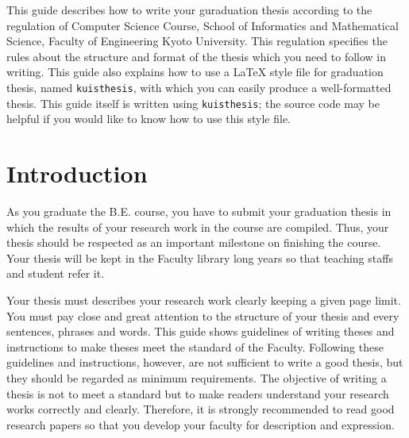 \documentclass[english]{kuisthesis}
\date{February 10, 2021}			%
\begin{document}
\maketitle					%

\begin{eabstract}				%
This guide describes how to write your guraduation thesis
according to the regulation of Computer Science Course, 
School of Informatics and Mathematical Science,
Faculty of Engineering Kyoto University. 
This regulation specifies the rules about the structure 
and format of the thesis which you need to follow in writing.
This guide also explains how to use a \LaTeX{} style file for
graduation thesis, named \verb|kuisthesis|, 
with which you can easily produce a well-formatted thesis. 
This guide itself is written using \verb|kuisthesis|; 
the source code may be helpful 
if you would like to know how to use this style file.
\end{eabstract}

\begin{jabstract}				%
$B$3$N<j0z$O!$5~ETBg3X9)3XIt>pJs3X2J7W;;5!2J3X%
$BFCJL8&5fJs9p=q$N9=@.$H7A<0$K$D$$$F@bL@$7$?$b$N$G$"$k!%
$B$^$?!$Ev%
$B%
$B$J$*!$$3$N<j0z<+BN$b(B\verb|kuisthesis|$B$rMQ$$!$(B
$BDj$a$i$l$?7A<0$K=>$C$F:n@.$5$l$F$$$k$N$G!$(B
$BI,MW$K1~$8$F%
\end{jabstract}

\tableofcontents				%

\section{Introduction}\label{sec-intro}		%
As you graduate the B.E. course, you have to submit your graduation thesis 
in which the results of your research work in the course are compiled. 
Thus, your thesis should be respected as an important milestone on finishing the course.  
Your thesis will be kept in the Faculty library long years so that teaching staffs
and student refer it.

Your thesis must describes your research work clearly keeping a given page
limit.  You must pay close and great attention to the structure of your
thesis and every sentences, phrases and words.  This guide shows guidelines
of writing theses and instructions to make theses meet the standard of the
Faculty.  Following these guidelines and instructions, however, are not
sufficient to write a good thesis, but they should be regarded as minimum
requirements.  The objective of writing a thesis is not to meet a standard
but to make readers understand your research works correctly and clearly.
Therefore, it is strongly recommended to read good research papers so that
you develop your faculty for description and expression.
\end{document}
